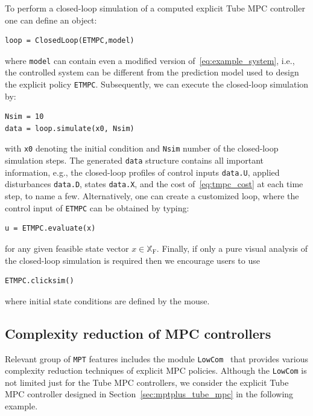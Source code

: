\documentclass[letterpaper, 10 pt, conference]{ieeeconf}
\begin{document}
To perform a closed-loop simulation of a computed explicit Tube MPC controller one can define an object:
\begin{verbatim}
loop = ClosedLoop(ETMPC,model)
\end{verbatim}
where \verb|model| can contain even a modified version of~\eqref{eq:example_system}, i.e., the controlled system can be different from the prediction model used to design the explicit policy \verb|ETMPC|. Subsequently, we can execute the closed-loop simulation by:
\begin{verbatim}
Nsim = 10
data = loop.simulate(x0, Nsim)
\end{verbatim}	
with \verb|x0| denoting the initial condition and \verb|Nsim| number of the closed-loop simulation steps. The generated \verb|data| structure contains all important information, e.g., the closed-loop profiles of control inputs \verb|data.U|, applied disturbances \verb|data.D|, states \verb|data.X|, and the cost of~\eqref{eq:tmpc_cost} at each time step, to name a few.
Alternatively, one can create a customized loop, where the control input of \verb|ETMPC| can be obtained by typing: 
\begin{verbatim}
u = ETMPC.evaluate(x)
\end{verbatim}
for any given feasible state vector $x\in\mathbb{X}_{\mathrm{F}}$.
%
Finally, if only a pure visual analysis of the closed-loop simulation is required then we encourage users to use
\begin{verbatim}
ETMPC.clicksim()
\end{verbatim}
where initial state conditions are defined by the mouse.
%

\subsection{Complexity reduction of MPC controllers}
\label{sec:code_mpt3lowcom}

Relevant group of \texttt{MPT} features includes the module \texttt{LowCom}~\cite{KH15} that provides various complexity reduction techniques of explicit MPC policies. Although the \texttt{LowCom} is not limited just for the Tube MPC controllers, we consider the explicit Tube MPC controller designed in Section~\ref{sec:mptplus_tube_mpc} in the following example.
\end{document}
